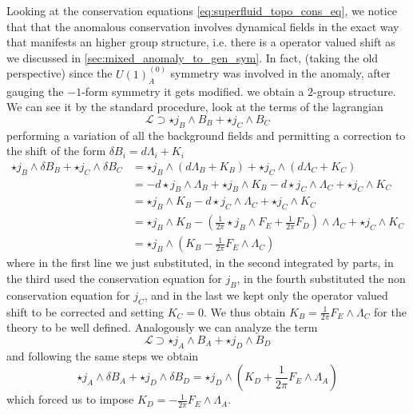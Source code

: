 \documentclass[aps,preprint,nofootinbib,preprintnumbers,eqsecnum,superscriptaddress]{revtex4}
\numberwithin{equation}{section}
\begin{document}
Looking at the conservation equations \ref{eq:superfluid_topo_cons_eq}, we notice that that the anomalous conservation involves dynamical fields in the exact way that manifests an higher group structure, i.e. there is a operator valued shift as we discussed in \ref{sec:mixed_anomaly_to_gen_sym}. In fact, (taking the old perspective) since the $U(1)^{(0)}_A$ symmetry was involved in the anomaly, after gauging the $-1$-form symmetry it gets modified. we obtain a $2$-group structure. 
We can see it by the standard procedure, look at the terms of the lagrangian
\begin{equation}
    \mathcal{L} \supset \star j_B \wedge B_B + \star j_C \wedge B_C 
\end{equation}
performing a variation of all the background fields and permitting a correction to the shift of the form $\delta B_i = d\Lambda_i + K_i$
\begin{align}
    \star j_B \wedge \delta B_B + \star j_C \wedge \delta B_C  
    &= \star j_B \wedge (d\Lambda_B + K_B) + \star j_C \wedge (d\Lambda_C + K_C)  \\
    &= -d\star j_B \wedge \Lambda_B + \star j_B \wedge K_B - d \star j_C \wedge \Lambda_C + \star j_C \wedge K_C  \\
    &= \star j_B \wedge K_B - d \star j_C \wedge \Lambda_C + \star j_C \wedge K_C  \\
    &= \star j_B \wedge K_B - \left(\frac{1}{2\pi} \star j_B\wedge F_E + \frac{1}{2\pi}F_D\right) \wedge \Lambda_C + \star j_C \wedge K_C  \\
    &= \star j_B \wedge \left( K_B - \frac{1}{2\pi} F_E \wedge \Lambda_C\right) 
\end{align}
where in the first line we just substituted, in the second integrated by parts, in the third used the conservation equation for $j_B$, in the fourth substituted the non conservation equation for $j_C$, and in the last we kept only the operator valued shift to be corrected and  setting $K_C = 0$. We thus obtain $K_B = \frac{1}{2\pi} F_E \wedge \Lambda_C$ for the theory to be well defined. Analogously we can analyze the term
\begin{equation}
    \mathcal{L} \supset \star j_A \wedge B_A + \star j_D \wedge B_D 
\end{equation}
and following the same steps we obtain
\begin{equation}
    \star j_A \wedge \delta B_A + \star j_D \wedge \delta B_D = \star j_D \wedge \left( K_D + \frac{1}{2\pi} F_E \wedge \Lambda_A\right)
\end{equation}
which forced us to impose $K_D = -\frac{1}{2\pi} F_E \wedge \Lambda_A$. 
\end{document}
